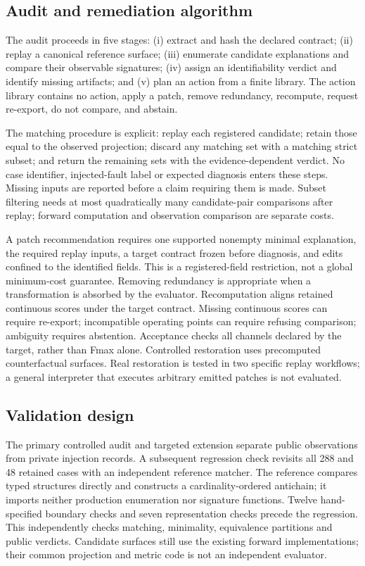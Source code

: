 \documentclass[11pt]{article}
\begin{document}
\subsection{Audit and remediation algorithm}
The audit proceeds in five stages: (i) extract and hash the declared contract; (ii) replay a canonical reference surface; (iii) enumerate candidate explanations and compare their observable signatures; (iv) assign an identifiability verdict and identify missing artifacts; and (v) plan an action from a finite library. The action library contains no action, apply a patch, remove redundancy, recompute, request re-export, do not compare, and abstain.

The matching procedure is explicit: replay each registered candidate; retain those equal to the observed projection; discard any matching set with a matching strict subset; and return the remaining sets with the evidence-dependent verdict. No case identifier, injected-fault label or expected diagnosis enters these steps. Missing inputs are reported before a claim requiring them is made. Subset filtering needs at most quadratically many candidate-pair comparisons after replay; forward computation and observation comparison are separate costs.

A patch recommendation requires one supported nonempty minimal explanation, the required replay inputs, a target contract frozen before diagnosis, and edits confined to the identified fields. This is a registered-field restriction, not a global minimum-cost guarantee. Removing redundancy is appropriate when a transformation is absorbed by the evaluator. Recomputation aligns retained continuous scores under the target contract. Missing continuous scores can require re-export; incompatible operating points can require refusing comparison; ambiguity requires abstention. Acceptance checks all channels declared by the target, rather than Fmax alone. Controlled restoration uses precomputed counterfactual surfaces. Real restoration is tested in two specific replay workflows; a general interpreter that executes arbitrary emitted patches is not evaluated.

\subsection{Validation design}
The primary controlled audit and targeted extension separate public observations from private injection records. A subsequent regression check revisits all 288 and 48 retained cases with an independent reference matcher. The reference compares typed structures directly and constructs a cardinality-ordered antichain; it imports neither production enumeration nor signature functions. Twelve hand-specified boundary checks and seven representation checks precede the regression. This independently checks matching, minimality, equivalence partitions and public verdicts. Candidate surfaces still use the existing forward implementations; their common projection and metric code is not an independent evaluator.
\end{document}
